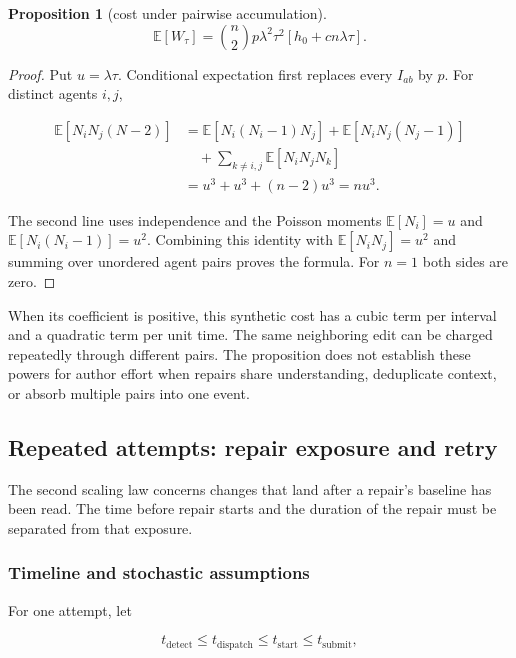 \documentclass[pdflatex,sn-mathphys-ay]{sn-jnl}
\theoremstyle{thmstyleone}
\newtheorem{proposition}[theorem]{Proposition}
\theoremstyle{thmstylethree}
\begin{document}
\begin{appendices}
\begin{proposition}[cost under pairwise accumulation]
\[
\mathbb E[W_\tau]
=\binom n2p\lambda^2\tau^2
  [h_0+cn\lambda\tau].
\]

\end{proposition}
\begin{proof}

Put \(u=\lambda\tau\). Conditional expectation first replaces every \(I_{ab}\) by \(p\). For distinct agents \(i,j\),

\[
\begin{aligned}
\mathbb E[N_iN_j(N-2)]
&=\mathbb E[N_i(N_i-1)N_j]
 +\mathbb E[N_iN_j(N_j-1)]\\
&\quad+\sum_{k\ne i,j}\mathbb E[N_iN_jN_k]\\
&=u^3+u^3+(n-2)u^3
=nu^3.
\end{aligned}
\]

The second line uses independence and the Poisson moments \(\mathbb E[N_i]=u\) and \(\mathbb E[N_i(N_i-1)]=u^2\). Combining this identity with \(\mathbb E[N_iN_j]=u^2\) and summing over unordered agent pairs proves the formula. For \(n=1\) both sides are zero.

\end{proof}

When its coefficient is positive, this synthetic cost has a cubic term per interval and a quadratic term per unit time. The same neighboring edit can be charged repeatedly through different pairs. The proposition does not establish these powers for author effort when repairs share understanding, deduplicate context, or absorb multiple pairs into one event.

\subsection{Repeated attempts: repair exposure and retry}\label{app:exposure}

The second scaling law concerns changes that land after a repair's baseline has been read. The time before repair starts and the duration of the repair must be separated from that exposure.

\subsubsection{Timeline and stochastic assumptions}\label{app:exposure-timeline}

For one attempt, let

\[
t_{\mathrm{detect}}\le t_{\mathrm{dispatch}}
\le t_{\mathrm{start}}\le t_{\mathrm{submit}},
\]


\end{appendices}
\end{document}
